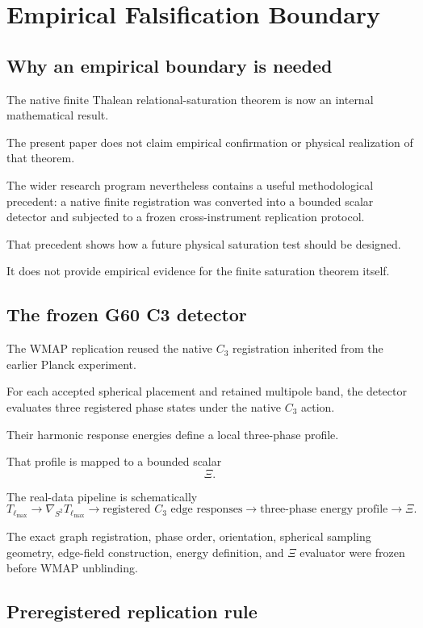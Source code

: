 \section{Empirical Falsification Boundary}

\subsection{Why an empirical boundary is needed}


The native finite Thalean relational-saturation theorem is now an
internal mathematical result.

The present paper does not claim empirical confirmation or physical
realization of that theorem.

The wider research program nevertheless contains a useful
methodological precedent: a native finite registration was converted
into a bounded scalar detector and subjected to a frozen
cross-instrument replication protocol.

That precedent shows how a future physical saturation test should be
designed.

It does not provide empirical evidence for the finite saturation
theorem itself.

\subsection{The frozen G60 C3 detector}

The WMAP replication \citep{cave2026wmap} reused the native
\(C_3\) registration inherited from the earlier Planck experiment.

For each accepted spherical placement and retained multipole band, the
detector evaluates three registered phase states under the native
\(C_3\) action.

Their harmonic response energies define a local three-phase profile.

That profile is mapped to a bounded scalar
\[
\Xi.
\]

The real-data pipeline is schematically
\[
T_{\ell_{\max}}
\longrightarrow
\nabla_{S^2}T_{\ell_{\max}}
\longrightarrow
\text{registered }C_3\text{ edge responses}
\longrightarrow
\text{three-phase energy profile}
\longrightarrow
\Xi.
\]

The exact graph registration, phase order, orientation, spherical
sampling geometry, edge-field construction, energy definition, and
\(\Xi\) evaluator were frozen before WMAP unblinding.

\subsection{Preregistered replication rule}

